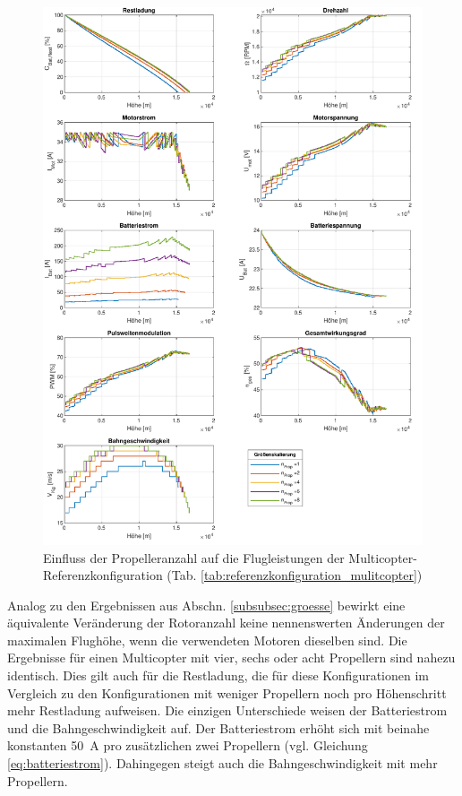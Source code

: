 \begin{figure}[H]
	\includegraphics[scale=0.7]{Diagramme/Anz_Prop.pdf}
	\caption{Einfluss der Propelleranzahl auf die Flugleistungen der Multicopter-Referenzkonfiguration (Tab. \ref{tab:referenzkonfiguration_mulitcopter})}
	\label{abb:groessenskalierung}
\end{figure}
Analog zu den Ergebnissen aus Abschn. \ref{subsubsec:groesse} bewirkt eine äquivalente Veränderung der Rotoranzahl keine nennenswerten Änderungen der maximalen Flughöhe, wenn die verwendeten Motoren dieselben sind. Die Ergebnisse für einen Multicopter mit vier, sechs oder acht Propellern sind nahezu identisch. Dies gilt auch für die Restladung, die für diese Konfigurationen im Vergleich zu den Konfigurationen mit weniger Propellern noch pro Höhenschritt mehr Restladung aufweisen. Die einzigen Unterschiede weisen der Batteriestrom und die Bahngeschwindigkeit auf. Der Batteriestrom erhöht sich mit beinahe konstanten \SI{50}{A} pro zusätzlichen zwei Propellern (vgl. Gleichung \eqref{eq:batteriestrom}). Dahingegen steigt auch die Bahngeschwindigkeit mit mehr Propellern. \\
